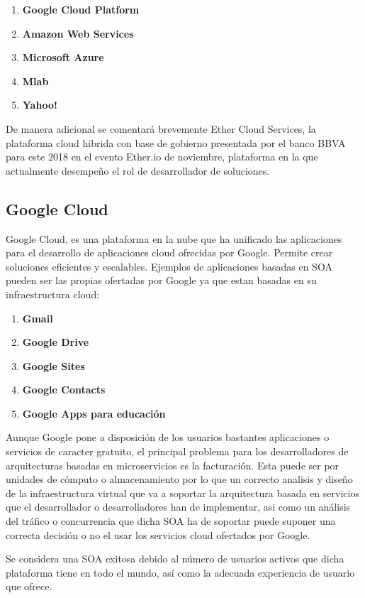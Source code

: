 \documentclass[a4paper,11pt]{book}
\begin{document}
\begin{enumerate}
\item \textbf{Google Cloud Platform}
\item \textbf{Amazon Web Services}
\item \textbf{Microsoft Azure}
\item \textbf{Mlab}
\item \textbf{Yahoo!}
\end{enumerate}

De manera adicional se comentará brevemente Ether Cloud Services, la plataforma cloud hibrida con base de gobierno presentada por el banco BBVA para este 2018 en el evento Ether.io de noviembre, plataforma en la que actualmente desempeño el rol de desarrollador de soluciones. 

\subsection{Google Cloud}

Google Cloud\cite{google}, es una plataforma en la nube que ha unificado las aplicaciones para el desarrollo de aplicaciones cloud ofrecidas por Google. Permite crear soluciones  eficientes y escalables. Ejemplos de aplicaciones basadas en SOA pueden ser las propias ofertadas por Google ya que estan basadas en su infraestructura cloud: 

\begin{enumerate}
\item \textbf{Gmail}
\item \textbf{Google Drive}
\item \textbf{Google Sites}
\item \textbf{Google Contacts}
\item \textbf{Google Apps para educación}
\end{enumerate}

Aunque Google pone a disposición de los usuarios bastantes aplicaciones o servicios de caracter gratuito, el principal problema para los desarrolladores de arquitecturas basadas en microservicios es la facturación. Esta puede ser por unidades de cómputo o almacenamiento por lo que un correcto analisis y diseño de la infraestructura virtual que va a soportar la arquitectura basada en servicios que el desarrollador o desarrolladores han de implementar, asi como un análisis del tráfico o concurrencia que dicha SOA ha de soportar puede suponer una correcta decisión o no el usar los servicios cloud ofertados por Google. 

Se considera una SOA exitosa debido al número de usuarios activos que dicha plataforma tiene en todo el mundo, así como la adecuada experiencia de usuario que ofrece. 
\end{document}

